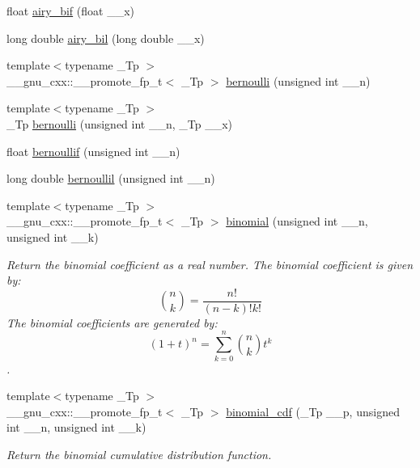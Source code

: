 \begin{DoxyCompactItemize}
\item 
float \hyperlink{group__gnu__math__spec__func_ga2ade465827bdba7370abbcce78e54912}{airy\+\_\+bif} (float \+\_\+\+\_\+x)
\item 
long double \hyperlink{group__gnu__math__spec__func_ga59240b3f40177e5187f3f194f624f0f8}{airy\+\_\+bil} (long double \+\_\+\+\_\+x)
\item 
{\footnotesize template$<$typename \+\_\+\+Tp $>$ }\\\+\_\+\+\_\+gnu\+\_\+cxx\+::\+\_\+\+\_\+promote\+\_\+fp\+\_\+t$<$ \+\_\+\+Tp $>$ \hyperlink{group__gnu__math__spec__func_gaebe41d6ec250e8fcc213eee9b392fd5f}{bernoulli} (unsigned int \+\_\+\+\_\+n)
\item 
{\footnotesize template$<$typename \+\_\+\+Tp $>$ }\\\+\_\+\+Tp \hyperlink{group__gnu__math__spec__func_ga140e17e038ab0e3875c1b3fad09bc991}{bernoulli} (unsigned int \+\_\+\+\_\+n, \+\_\+\+Tp \+\_\+\+\_\+x)
\item 
float \hyperlink{group__gnu__math__spec__func_gabcd77f012ae74989c4bb9ca61978481d}{bernoullif} (unsigned int \+\_\+\+\_\+n)
\item 
long double \hyperlink{group__gnu__math__spec__func_gaac8f04abfdd6b744d11cb73ec1f564b1}{bernoullil} (unsigned int \+\_\+\+\_\+n)
\item 
{\footnotesize template$<$typename \+\_\+\+Tp $>$ }\\\+\_\+\+\_\+gnu\+\_\+cxx\+::\+\_\+\+\_\+promote\+\_\+fp\+\_\+t$<$ \+\_\+\+Tp $>$ \hyperlink{group__gnu__math__spec__func_ga36d917a1e6aa497e1b0c64245f636882}{binomial} (unsigned int \+\_\+\+\_\+n, unsigned int \+\_\+\+\_\+k)
\begin{DoxyCompactList}\small\item\em Return the binomial coefficient as a real number. The binomial coefficient is given by\+: \[ \binom{n}{k} = \frac{n!}{(n-k)! k!} \] The binomial coefficients are generated by\+: \[ \left(1 + t\right)^n = \sum_{k=0}^n \binom{n}{k} t^k \]. \end{DoxyCompactList}\item 
{\footnotesize template$<$typename \+\_\+\+Tp $>$ }\\\+\_\+\+\_\+gnu\+\_\+cxx\+::\+\_\+\+\_\+promote\+\_\+fp\+\_\+t$<$ \+\_\+\+Tp $>$ \hyperlink{group__gnu__math__spec__func_gababdb8009e34572d1a4f8a89ed799218}{binomial\+\_\+cdf} (\+\_\+\+Tp \+\_\+\+\_\+p, unsigned int \+\_\+\+\_\+n, unsigned int \+\_\+\+\_\+k)
\begin{DoxyCompactList}\small\item\em Return the binomial cumulative distribution function. \end{DoxyCompactList}\item 

\end{DoxyCompactItemize}
